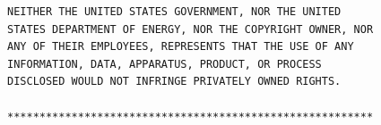 \documentclass[paper=letter]{scrartcl}
\begin{document}
\begin{Verbatim}
NEITHER THE UNITED STATES GOVERNMENT, NOR THE UNITED
STATES DEPARTMENT OF ENERGY, NOR THE COPYRIGHT OWNER, NOR
ANY OF THEIR EMPLOYEES, REPRESENTS THAT THE USE OF ANY
INFORMATION, DATA, APPARATUS, PRODUCT, OR PROCESS
DISCLOSED WOULD NOT INFRINGE PRIVATELY OWNED RIGHTS.

*********************************************************


\end{Verbatim}
\end{document}
